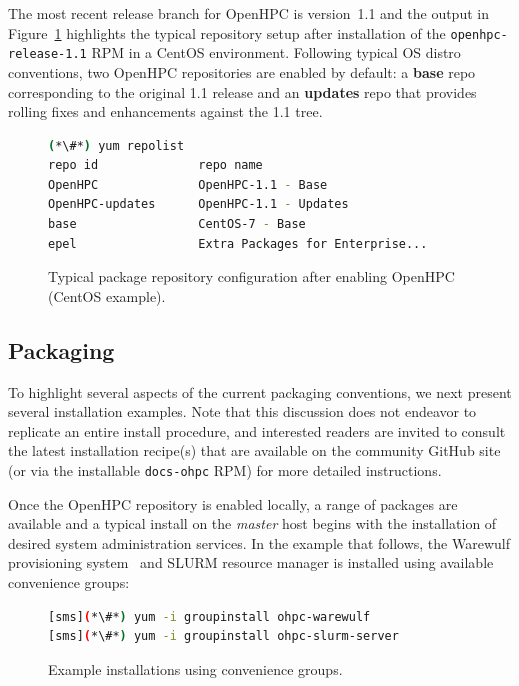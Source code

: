 \documentclass{sig-alternate-05-2015}
\begin{document}
The most recent release branch for OpenHPC is version~1.1 and the output in
Figure~\ref{fig:repolist} highlights the typical repository setup after
installation of the \texttt{openhpc-release-1.1} RPM in a CentOS
environment. Following typical OS distro conventions, two OpenHPC
repositories are enabled by default: a { \bf base} repo corresponding to the
original 1.1 release and an {\bf updates} repo that provides rolling fixes and
enhancements against the 1.1 tree.

\begin{figure}[h]
\begin{lstlisting}[language=bash,keywords={}]
(*\#*) yum repolist
repo id              repo name
OpenHPC              OpenHPC-1.1 - Base
OpenHPC-updates      OpenHPC-1.1 - Updates
base                 CentOS-7 - Base
epel                 Extra Packages for Enterprise...
\end{lstlisting}
\vspace*{-0.3cm}
  \caption{Typical package repository configuration after enabling OpenHPC
    (CentOS example).}
    \label{fig:repolist}
\end{figure}

\subsection{Packaging} \label{sec:packaging}

To highlight several aspects of the current packaging conventions, we next
present several installation examples. Note that this
discussion does not endeavor to replicate an entire install procedure, and
interested readers are invited to consult the latest installation recipe(s) that
are available on the community GitHub site (or via the installable
\texttt{docs-ohpc} RPM) for more detailed instructions.

Once the OpenHPC repository is enabled locally, a range of packages are
available and a typical install on the {\em master} host begins with the
installation of desired system administration services. In the example that
follows, the Warewulf provisioning system~\cite{warewulf_url} and SLURM
resource manager is installed using available convenience groups:

\begin{figure}[h]
\begin{lstlisting}[language=bash,keywords={}]
[sms](*\#*) yum -i groupinstall ohpc-warewulf
[sms](*\#*) yum -i groupinstall ohpc-slurm-server
\end{lstlisting}
\vspace*{-0.3cm}
  \caption{Example installations using convenience groups.}
    \label{fig:grouplinstall}
\end{figure}
  
\end{document}
